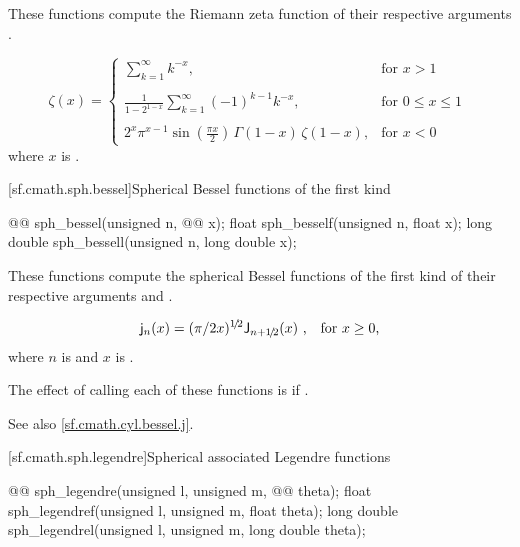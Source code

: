 \begin{itemdescr}

\pnum
\effects
These functions compute the Riemann zeta function
of their respective arguments
.

\pnum
\returns
\[%
  \mathsf{\zeta}(x) =
  \left\{
  \begin{array}{cl}
  \displaystyle
  \sum_{k=1}^\infty k^{-x},
  & \mbox{for $x > 1$}
  \\
  \\
  \displaystyle
  \frac{1}
	{1 - 2^{1-x}}
  \sum_{k=1}^\infty (-1)^{k-1} k^{-x},
  & \mbox{for $0 \le x \le 1$}
  \\
  \\
  \displaystyle
  2^x \pi^{x-1} \sin(\frac{\pi x}{2}) \, \Gamma(1-x) \, \zeta(1-x),
  & \mbox{for $x < 0$}
  \end{array}
  \right.
\;
\]
where
$x$ is .
\end{itemdescr}

[sf.cmath.sph.bessel]{Spherical Bessel functions of the first kind}%
%
%
%
%
%
\begin{itemdecl}
@@ sph_bessel(unsigned n, @@ x);
float        sph_besself(unsigned n, float x);
long double  sph_bessell(unsigned n, long double x);
\end{itemdecl}

\begin{itemdescr}
\pnum
\effects
These functions compute
the spherical Bessel functions of the first kind
of their respective arguments
 and .

\pnum
\returns
\[ \mathsf{j}_n(x) = (\pi/2x)^{1\!/\!2} \mathsf{J}_{n + 1\!/\!2}(x) \text{ ,\quad for $x \ge 0$,} \]
where
$n$ is  and
$x$ is .

\pnum
\remarks
The effect of calling each of these functions
is 
if .

\pnum
See also \ref{sf.cmath.cyl.bessel.j}.
\end{itemdescr}

[sf.cmath.sph.legendre]{Spherical associated Legendre functions}%
%
%
%
%
%
%
\begin{itemdecl}
@@ sph_legendre(unsigned l, unsigned m, @@ theta);
float        sph_legendref(unsigned l, unsigned m, float theta);
long double  sph_legendrel(unsigned l, unsigned m, long double theta);
\end{itemdecl}

